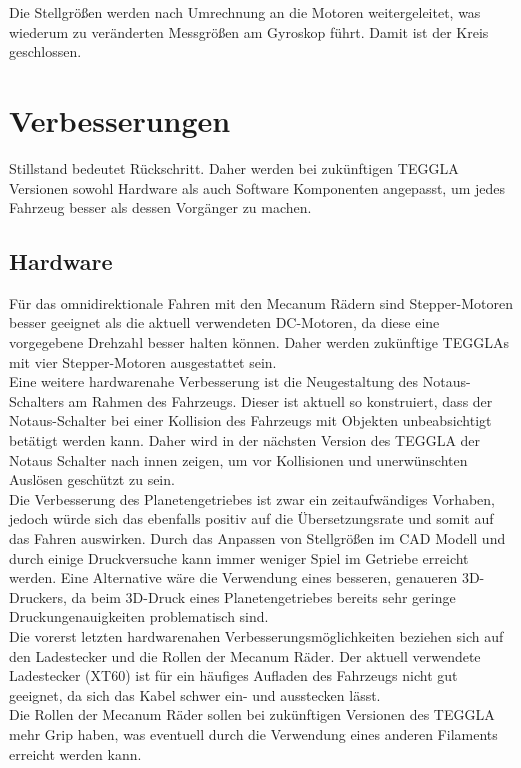 Die Stellgrößen werden nach Umrechnung an die Motoren weitergeleitet, was wiederum zu veränderten Messgrößen am Gyroskop führt. 
Damit ist der Kreis geschlossen. 


\section{Verbesserungen}
Stillstand bedeutet Rückschritt. Daher werden bei zukünftigen TEGGLA Versionen sowohl Hardware als auch Software Komponenten angepasst, um jedes Fahrzeug besser als dessen Vorgänger zu machen.

\subsection{Hardware}
Für das omnidirektionale Fahren mit den Mecanum Rädern sind Stepper-Motoren besser geeignet als die aktuell verwendeten DC-Motoren, da diese eine vorgegebene Drehzahl besser halten können. Daher werden zukünftige TEGGLAs mit vier Stepper-Motoren ausgestattet sein.\\

Eine weitere hardwarenahe Verbesserung ist die Neugestaltung des Notaus-Schalters am Rahmen des Fahrzeugs. Dieser ist aktuell so konstruiert, dass der Notaus-Schalter bei einer Kollision des Fahrzeugs mit Objekten unbeabsichtigt betätigt werden kann. Daher wird in der nächsten Version des TEGGLA der Notaus Schalter nach innen zeigen, um vor Kollisionen und unerwünschten Auslösen geschützt zu sein.\\

Die Verbesserung des Planetengetriebes ist zwar ein zeitaufwändiges Vorhaben, jedoch würde sich das ebenfalls positiv auf die Übersetzungsrate und somit auf das Fahren auswirken. Durch das Anpassen von Stellgrößen im CAD Modell und durch einige Druckversuche kann immer weniger Spiel im Getriebe erreicht werden. Eine Alternative wäre die Verwendung eines besseren, genaueren 3D-Druckers, da beim 3D-Druck eines Planetengetriebes bereits sehr geringe Druckungenauigkeiten problematisch sind.\\

Die vorerst letzten hardwarenahen Verbesserungsmöglichkeiten beziehen sich auf den Ladestecker und die Rollen der Mecanum Räder. Der aktuell verwendete Ladestecker (XT60) ist für ein häufiges Aufladen des Fahrzeugs nicht gut geeignet, da sich das Kabel schwer ein- und ausstecken lässt.\\

Die Rollen der Mecanum Räder sollen bei zukünftigen Versionen des TEGGLA mehr Grip haben, was eventuell durch die Verwendung eines anderen Filaments erreicht werden kann.\\


